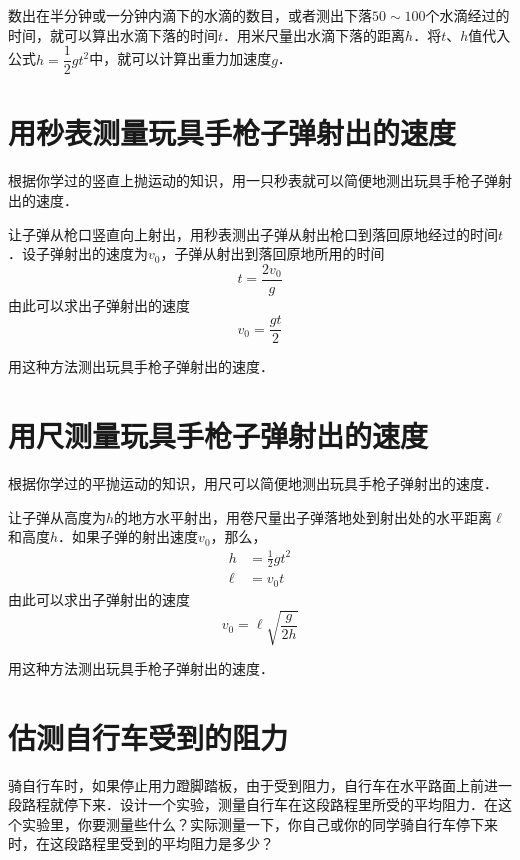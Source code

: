 数出在半分钟或一分钟内滴下的水滴的数目，或者测出下落$50 \sim 100$个水滴经过的时间，就可以算出水滴下落的时间$t$．用米尺量出水滴下落的距离$h$．将$t$、$h$值代入公式$h=\dfrac{1}{2}gt^2$中，就可以计算出重力加速度$g$．

\section{用秒表测量玩具手枪子弹射出的速度}
根据你学过的竖直上抛运动的知识，用一只秒表就可以简便地测出玩具手枪子弹射出的速度．

让子弹从枪口竖直向上射出，用秒表测出子弹从射出枪口到落回原地经过的时间$t$．设子弹射出的速度为$v_0$，子弹从射出到落回原地所用的时间
\[t=\frac{2v_0}{g}\]
由此可以求出子弹射出的速度
\[v_0=\frac{gt}{2}\]

用这种方法测出玩具手枪子弹射出的速度．

\section{用尺测量玩具手枪子弹射出的速度}
根据你学过的平抛运动的知识，用尺可以简便地测出玩具手枪子弹射出的速度．

让子弹从高度为$h$的地方水平射出，用卷尺量出子弹落地处到射出处的水平距离$\ell$和高度$h$．如果子弹的射出速度$v_0$，那么，
\[\begin{split}
    h&=\frac{1}{2}gt^2\\
    \ell&=v_0t
\end{split}\]
由此可以求出子弹射出的速度
\[v_0=\ell \sqrt{\frac{g}{2h}}\]

用这种方法测出玩具手枪子弹射出的速度．

\section{估测自行车受到的阻力}

骑自行车时，如果停止用力蹬脚踏板，由于受到阻力，自行车在水平路面上前进一段路程就停下来．设计一个实验，测量自行车在这段路程里所受的平均阻力．在这个实验里，你要测量些什么？实际测量一下，你自己或你的同学骑自行车停下来时，在这段路程里受到的平均阻力是多少？

